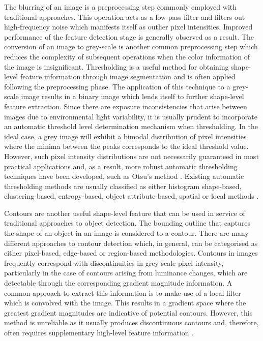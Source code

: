 The blurring of an image is a preprocessing step commonly employed with traditional approaches. This operation acts as a low-pass filter and filters out high-frequency noise which manifests itself as outlier pixel intensities. Improved performance of the feature detection stage is generally observed as a result. The conversion of an image to grey-scale is another common preprocessing step which reduces the complexity of subsequent operations when the color information of the image is insignificant. Thresholding is a useful method for obtaining shape-level feature information through image segmentation and is often applied following the preprocessing phase. The application of this technique to a grey-scale image results in a binary image which lends itself to further shape-level feature extraction. Since there are exposure inconsistencies that arise between images due to environmental light variability, it is usually prudent to incorporate an automatic threshold level determination mechanism when thresholding. In the ideal case, a grey image will exhibit a bimodal distribution of pixel intensities where the minima between the peaks corresponds to the ideal threshold value. However, such pixel intensity distributions are not necessarily guaranteed in most practical applications and, as a result, more robust automatic thresholding techniques have been developed, such as Otsu's method \cite{Otsu:Threshold_Selection_Method}. Existing automatic thresholding methods are usually classified as either histogram shape-based, clustering-based, entropy-based, object attribute-based, spatial or local methods \cite{Guruprasad:Overview_of_Thresholding_Methods}.

Contours are another useful shape-level feature that can be used in service of traditional approaches to object detection. The bounding outline that captures the shape of an object in an image is considered to a contour. There are many different approaches to contour detection which, in general, can be categorised as either pixel-based, edge-based or region-based methodologies. Contours in images frequently correspond with discontinuities in grey-scale pixel intensity, particularly in the case of contours arising from luminance changes, which are detectable through the corresponding gradient magnitude information. A common approach to  extract this information is to make use of a local filter which is convolved with the image. This results in a gradient space where the greatest gradient magnitudes are indicative of potential contours. However, this method is unreliable as it usually produces discontinuous contours and, therefore, often requires supplementary high-level feature information \cite{Gong2018:Overview_of_Contour_Detection_Approaches}.

